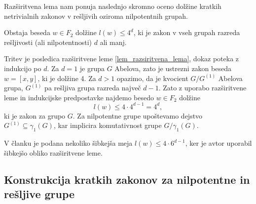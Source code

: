 \documentclass[mat1, tisk]{fmfdelo}
\numberwithin{equation}{section}  %
\begin{document}
    Razširitvena lema nam ponuja naslednjo skromno oceno dolžine kratkih netrivialnih zakonov v rešljivih oziroma nilpotentnih grupah.

    \begin{trditev}
    \label{trd_ocitna_meja_za_kratke_zakone_resljive_grupe}
     Obstaja beseda $w \in F_2$ dolžine $l(w) \le 4^{d}$, ki je zakon v vseh grupah razreda rešljivosti (ali nilpotentnosti) $d$ ali manj.  
    \end{trditev}
    \begin{dokaz}
        Tritev je posledica razširitvene leme \ref{lem_razsiritvena_lema}, dokaz poteka z indukcijo po $d$. Za $d = 1$ je grupa $G$ Abelova, zato je ustrezni zakon beseda $w = [x,y]$, ki je dolžine 4.
        Za $d > 1$ opazimo, da je kvocient $G / G^{(1)}$ Abelova grupa, $G^{(1)}$ pa rešljiva grupa razreda največ $d - 1$. Zato z uporabo razširitvene leme in indukcijske predpostavke najdemo besedo $w \in  F_2$ dolžine \begin{equation*}
            l(w) \le  4 \cdot 4^{d - 1} = 4^{d},
        \end{equation*}  
        ki je zakon za grupo $G$. Za nilpotentne grupe upoštevamo dejstvo $G^{(1)} \subseteq \gamma_1(G)$, kar implicira komutativnost grupe $G / \gamma_1(G)$. 
    \end{dokaz}
    
    \begin{opomba}
    V članku \cite[str.~8]{Kozma_Thom_2016} je podana nekoliko šibkejša meja $l(w) \le  4 \cdot 6^{d-1}$, ker je avtor uporabil šibkejšo obliko razširitvene leme.
    \end{opomba}

\subsection{Konstrukcija kratkih zakonov za nilpotentne in rešljive grupe}
\end{document}
